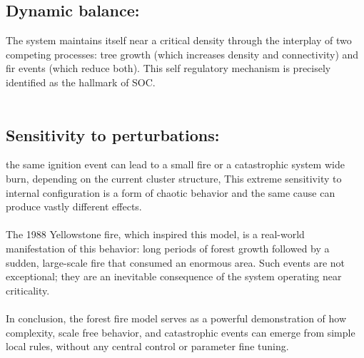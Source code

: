 \documentclass{article}
\begin{document}
\subsection{Dynamic balance:}
The system maintains itself near a critical density through the interplay of two competing processes: tree growth (which increases density and connectivity) and fir events (which reduce both). This self regulatory mechanism is precisely identified as the hallmark of SOC.\\
\\
\subsection{Sensitivity to perturbations:}
the same ignition event can lead to a small fire or a catastrophic system wide burn, depending on the current cluster structure, This extreme sensitivity to internal configuration is a form of chaotic behavior and the same cause can produce vastly different effects.\\
\\
The 1988 Yellowstone fire, which inspired this model, is a real-world manifestation of this behavior: long periods of forest growth followed by a sudden, large-scale fire that consumed an enormous area. Such events are not exceptional; they are an inevitable consequence of the system operating near criticality.\\
\\
In conclusion, the forest fire model serves as a powerful demonstration of how complexity, scale free behavior, and catastrophic events can emerge from simple local rules, without any central control or parameter fine tuning.\\
\\
\end{document}
